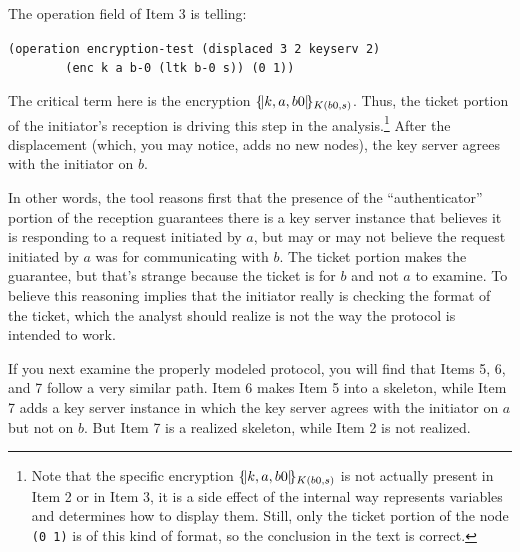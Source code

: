 The operation field of Item 3 is telling:

\begin{center}
\verb|(operation encryption-test (displaced 3 2 keyserv 2)|\\
\verb|        (enc k a b-0 (ltk b-0 s)) (0 1))|
\end{center}

The critical term here is the encryption $\{\!|k,a,b0|\!\}_{K(b0,s)}$.
Thus, the ticket portion of the initiator's reception is driving this
step in the analysis.\footnote{Note that the specific encryption
  $\{\!|k,a,b0|\!\}_{K(b0,s)}$ is not actually present in Item 2 or in Item
  3, it is a side effect of the internal way {\cpsa} represents
  variables and determines how to display them.  Still, only the
  ticket portion of the node \texttt{(0 1)} is of this kind of format,
  so the conclusion in the text is correct.}  After the displacement
(which, you may notice, adds no new nodes), the key server agrees with
the initiator on $b$.

In other words, the tool reasons first that the presence of the
``authenticator'' portion of the reception guarantees there is a key
server instance that believes it is responding to a request initiated
by $a$, but may or may not believe the request initiated by $a$ was
for communicating with $b$.  The ticket portion makes the guarantee,
but that's strange because the ticket is for $b$ and not $a$ to
examine.  To believe this reasoning implies that the initiator really
is checking the format of the ticket, which the analyst should realize
is not the way the protocol is intended to work.

If you next examine the properly modeled protocol, you will find that
Items 5, 6, and 7 follow a very similar path.  Item 6 makes Item 5 into
a skeleton, while Item 7 adds a key server instance in which the key
server agrees with the initiator on $a$ but not on $b$.  But Item 7 is
a realized skeleton, while Item 2 is not realized.

